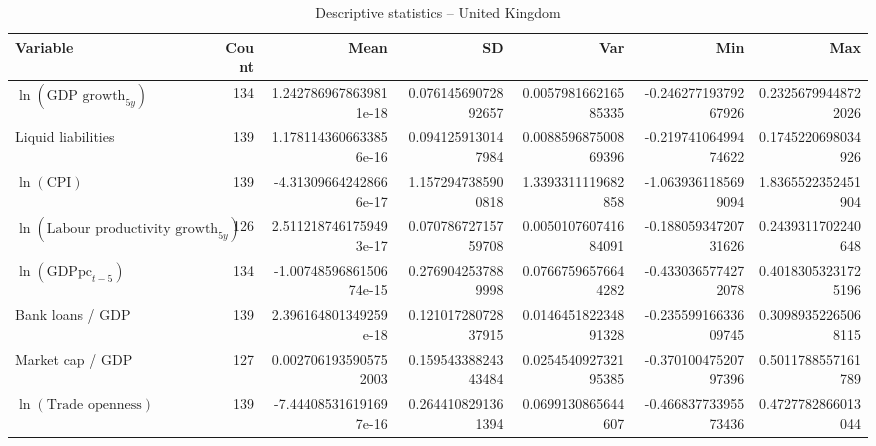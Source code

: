 \begin{table}[!htbp]
\centering
\caption{Descriptive statistics -- United Kingdom}
\footnotesize
\begin{tabular}{lrrrrrr}
\toprule
Variable & Count & Mean & SD & Var & Min & Max \\
\midrule
$\ln(\text{GDP growth}_{5y})$ & 134 & 1.2427869678639811e-18 & 0.07614569072892657 & 0.005798166216585335 & -0.24627719379267926 & 0.23256799448722026 \\
Liquid liabilities & 139 & 1.1781143606633856e-16 & 0.0941259130147984 & 0.008859687500869396 & -0.21974106499474622 & 0.1745220698034926 \\
$\ln(\text{CPI})$ & 139 & -4.313096642428666e-17 & 1.1572947385900818 & 1.3393311119682858 & -1.0639361185699094 & 1.8365522352451904 \\
$\ln(\text{Labour productivity growth}_{5y})$ & 126 & 2.5112187461759493e-17 & 0.07078672715759708 & 0.005010760741684091 & -0.18805934720731626 & 0.2439311702240648 \\
$\ln(\text{GDPpc}_{t-5})$ & 134 & -1.0074859686150674e-15 & 0.2769042537889998 & 0.07667596576644282 & -0.4330365774272078 & 0.40183053231725196 \\
Bank loans / GDP & 139 & 2.396164801349259e-18 & 0.12101728072837915 & 0.014645182234891328 & -0.23559916633609745 & 0.30989352265068115 \\
Market cap / GDP & 127 & 0.0027061935905752003 & 0.15954338824343484 & 0.025454092732195385 & -0.37010047520797396 & 0.5011788557161789 \\
$\ln(\text{Trade openness})$ & 139 & -7.444085316191697e-16 & 0.2644108291361394 & 0.0699130865644607 & -0.46683773395573436 & 0.4727782866013044 \\
\bottomrule
\end{tabular}
\end{table}



